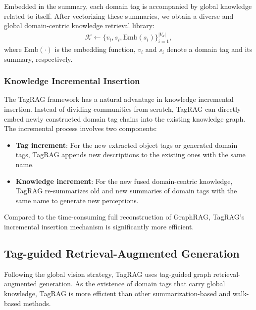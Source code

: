 \documentclass[11pt]{article}
\begin{document}
Embedded in the summary, each domain tag is accompanied by global knowledge related to itself.
After vectorizing these summaries, we obtain a diverse and global domain-centric knowledge retrieval library:
\begin{align*}
    \mathcal{K} \leftarrow \{v_i, s_i, \text{Emb}(s_i)\}_{i=1}^{\left | V_d \right |},
\end{align*}
where $\text{Emb}(\cdot)$ is the embedding function, $v_i$ and $s_i$ denote a domain tag and its summary,   respectively.



\subsubsection{Knowledge Incremental Insertion}
The TagRAG framework has a natural advantage in knowledge incremental insertion.
Instead of dividing communities from scratch, TagRAG can directly embed newly constructed domain tag chains into the existing knowledge graph.
The incremental process involves two components:

\begin{itemize}
    \item \textbf{Tag increment}: For the new extracted object tags or generated domain tags, TagRAG appends new descriptions to the existing ones with the same name.
    \item \textbf{Knowledge increment}: For the new fused domain-centric knowledge, TagRAG re-summarizes old and new summaries of domain tags with the same name to generate new perceptions.
\end{itemize}

Compared to the time-consuming full reconstruction of GraphRAG, TagRAG’s incremental insertion mechanism is significantly more efficient.



\subsection{Tag-guided Retrieval-Augmented Generation}
Following the global vision strategy, TagRAG uses tag-guided graph retrieval-augmented generation.
As the existence of domain tags that carry global knowledge, TagRAG is more efficient than other summarization-based and walk-based methods.
\end{document}
